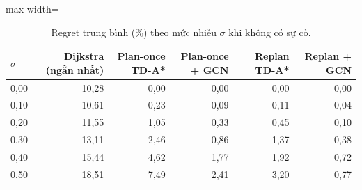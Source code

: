 \begin{table}[!htbp]
\centering
\small
\caption{Regret trung bình (\%) theo mức nhiễu $\sigma$ khi không có sự cố.}
\label{tab:tab_noise_sweep}
\begin{adjustbox}{max width=\linewidth}
\begin{tabular}{lrrrrr}
\toprule
$\sigma$ & Dijkstra (ngắn nhất) & Plan-once TD-A* & Plan-once + GCN & Replan TD-A* & Replan + GCN \\
\midrule
0{,}00 & 10{,}28 & 0{,}00 & 0{,}00 & 0{,}00 & 0{,}00 \\
0{,}10 & 10{,}61 & 0{,}23 & 0{,}09 & 0{,}11 & 0{,}04 \\
0{,}20 & 11{,}55 & 1{,}05 & 0{,}33 & 0{,}45 & 0{,}10 \\
0{,}30 & 13{,}11 & 2{,}46 & 0{,}86 & 1{,}37 & 0{,}38 \\
0{,}40 & 15{,}44 & 4{,}62 & 1{,}77 & 1{,}92 & 0{,}72 \\
0{,}50 & 18{,}51 & 7{,}49 & 2{,}41 & 3{,}20 & 0{,}77 \\
\bottomrule
\end{tabular}
\end{adjustbox}
\end{table}
